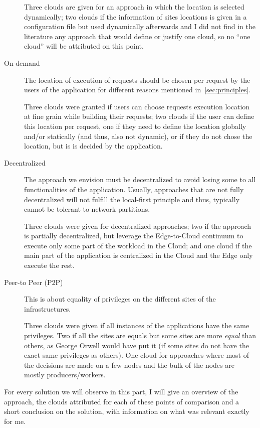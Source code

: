 \begin{description}
  Three clouds are given for an approach in which the location is
  selected dynamically; two clouds if the information of sites
  locations is given in a configuration file but used dynamically
  afterwards and I did not find in the literature any approach that
  would define or justify one cloud, so no ``one cloud'' will be
  attributed on this point.
\item [On-demand] The location of execution of requests should be
  chosen per request by the users of the application for different
  reasons mentioned in~\autoref{sec:principles}.

  Three clouds were granted if users can choose requests execution
  location at fine grain while building their requests; two clouds if
  the user can define this location per request, one if they need to
  define the location globally and/or statically (and thus, also not
  dynamic), or if they do not chose the location, but is is decided by
  the application.
\item [Decentralized] The approach we envision must be decentralized
  to avoid losing some to all functionalities of the application.
  Usually, approaches that are not fully decentralized will not
  fulfill the local-first principle and thus, typically cannot be
  tolerant to network partitions.

  Three clouds were given for decentralized approaches; two if the
  approach is partially decentralized, but leverage the Edge-to-Cloud
  continuum to execute only some part of the workload in the Cloud;
  and one cloud if the main part of the application is centralized in
  the Cloud and the Edge only execute the rest.

\item [Peer-to Peer (P2P)] This is about equality of privileges on the
  different sites of the infrastructures.

  Three clouds were given if all instances of the applications have
  the same privileges.
  Two if all the sites are equals but some sites are more \emph{equal}
  than others, as George Orwell would have put it (\ie if some sites
  do not have the exact same privileges as others).
  One cloud for approaches where most of the decisions are made on a
  few nodes and the bulk of the nodes are mostly producers/workers.
\end{description}

For every solution we will observe in this part, I will give an
overview of the approach, the clouds attributed for each of these
points of comparison and a short conclusion on the solution, with
information on what was relevant exactly for me.




